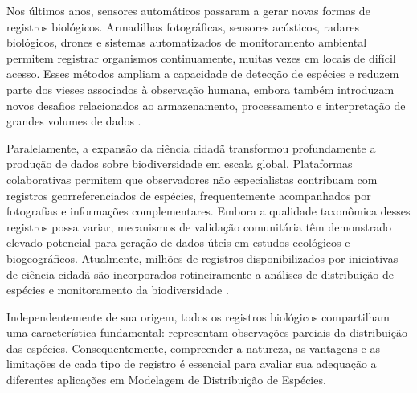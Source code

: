 Nos últimos anos, sensores automáticos passaram a gerar novas formas de registros biológicos. Armadilhas fotográficas, sensores acústicos, radares biológicos, drones e sistemas automatizados de monitoramento ambiental permitem registrar organismos continuamente, muitas vezes em locais de difícil acesso. Esses métodos ampliam a capacidade de detecção de espécies e reduzem parte dos vieses associados à observação humana, embora também introduzam novos desafios relacionados ao armazenamento, processamento e interpretação de grandes volumes de dados \parencite{burton2015wildlife}.

Paralelamente, a expansão da ciência cidadã transformou profundamente a produção de dados sobre biodiversidade em escala global. Plataformas colaborativas permitem que observadores não especialistas contribuam com registros georreferenciados de espécies, frequentemente acompanhados por fotografias e informações complementares. Embora a qualidade taxonômica desses registros possa variar, mecanismos de validação comunitária têm demonstrado elevado potencial para geração de dados úteis em estudos ecológicos e biogeográficos. Atualmente, milhões de registros disponibilizados por iniciativas de ciência cidadã são incorporados rotineiramente a análises de distribuição de espécies e monitoramento da biodiversidade \parencite{sullivan2014ebird,callaghan2021global}.

Independentemente de sua origem, todos os registros biológicos compartilham uma característica fundamental: representam observações parciais da distribuição das espécies. Consequentemente, compreender a natureza, as vantagens e as limitações de cada tipo de registro é essencial para avaliar sua adequação a diferentes aplicações em Modelagem de Distribuição de Espécies.

